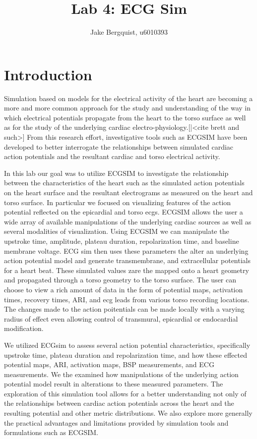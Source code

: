\documentclass[12pt]{article}
\begin{document}
\title{Lab 4: ECG Sim}
\author{Jake Bergquist, u6010393 }
\maketitle

\section{Introduction}
\par{}
Simulation based on models for the electrical activity of the heart are becoming a more and more common approach for the study and understanding of the way in which electrical potentials propagate from the heart to the torso surface as well as for the study of the underlying cardiac electro-physiology.[|<cite brett and such>] From this research effort, investigative tools such as ECGSIM have been developed to better interrogate the relationships between simulated cardiac action potentials and the resultant cardiac and torso electrical activity. 

In this lab our goal was to utilize ECGSIM to investigate the relationship between the characteristics of the heart such as the simulated action potentials on the heart surface and the resultant electrograms as measured on the heart and torso surface. In particular we focused on visualizing features of the action potential reflected on the epicardial and torso ecgs. ECGSIM allows the user a wide array of available manipulations of the underlying cardiac sources as well as several modalities of visualization. Using ECGSIM we can manipulate the upstroke time, amplitude, plateau duration, repolarization time, and baseline membrane voltage. ECG sim then uses these parameters the alter an underlying action potential model and generate transmembrane, and extracellular potentials for a heart beat. These simulated values zare the mapped onto a heart geometry and propagated through a torso geometry to the torso surface. The user can choose to view a rich amount of data in the form of potential maps, activation times, recovery times, ARI, and ecg leads from various torso recording locations. The changes made to the action poitentials can be made locally with a varying radius of effect even allowing control of transmural, epicardial or endocardial modification.

We utilized ECGsim to assess several action potential characteristics, specifically upstroke time, plateau duration and repolarization time, and how these effected potential maps, ARI, activation maps, BSP measurements, and ECG measurements. We the examined how manipulations of the underlying action potential model result in alterations to these measured parameters. The exploration of this simulation tool allows for a better understanding not only of the relationships between cardiac action potentials across the heart and the resulting potential and other metric distributions. We also explore more generally the practical advantages and limitations provided by simulation tools and formulations such as ECGSIM.
\end{document}
